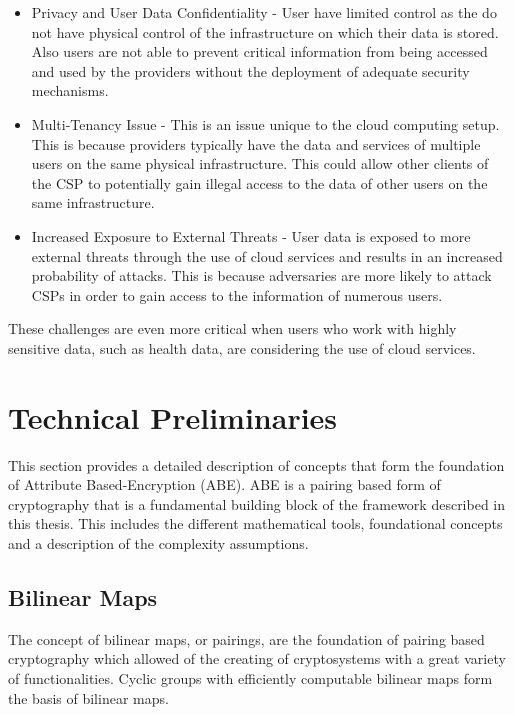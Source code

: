 \begin{itemize}
	\item Privacy and User Data Confidentiality - User have limited control as the do not have physical control of the infrastructure on which their data is stored. Also users are not able to prevent critical information from being accessed and used by the providers without the deployment of adequate security mechanisms.
	
	\item Multi-Tenancy Issue - This is an issue unique to the cloud computing setup. This is because providers typically have the data and services of multiple users on the same physical infrastructure. This could allow other clients of the CSP to potentially gain illegal access to the data of other users on the same infrastructure.
	
	\item Increased Exposure to External Threats - User data is exposed to more external threats through the use of cloud services and results in an increased probability of attacks. This is because adversaries are more likely to attack CSPs in order to gain access to the information of numerous users.
	
\end{itemize}

These challenges are even more critical when users who work with highly sensitive data, such as health data, are considering the use of cloud services.

\section{Technical Preliminaries}

This section provides a detailed description of concepts that form the foundation of Attribute Based-Encryption (ABE). ABE is a pairing based form of cryptography that is a fundamental building block of the framework described in this thesis. This includes the different mathematical tools, foundational concepts and a description of the complexity assumptions.

\subsection{Bilinear Maps}

The concept of bilinear maps, or pairings, are the foundation of pairing based cryptography which allowed of the creating of cryptosystems with a great variety of functionalities. Cyclic groups with efficiently computable bilinear maps form the basis of bilinear maps.

